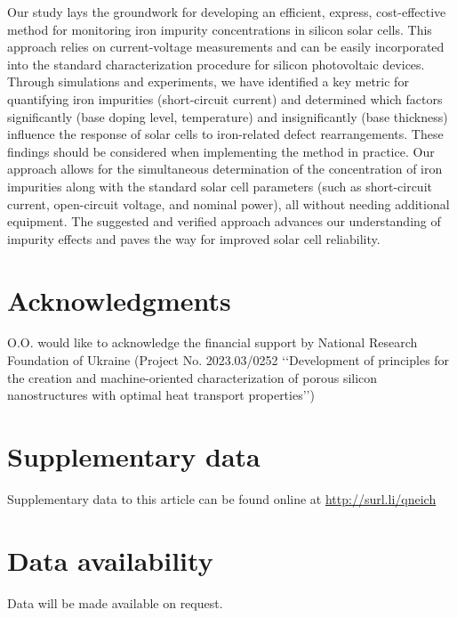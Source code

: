 \documentclass[a4paper,fleqn]{cas-sc}
\begin{document}
Our study lays the groundwork for developing an efficient, express, cost-effective method for monitoring iron impurity concentrations in silicon solar cells.
This approach relies on current-voltage measurements and can be easily incorporated into the standard characterization procedure for silicon photovoltaic devices.
Through simulations and experiments, we have identified a key metric for quantifying iron impurities (short-circuit current) and determined which factors significantly (base doping level, temperature) and insignificantly (base thickness) influence the response of solar cells to iron-related defect rearrangements.
These findings should be considered when implementing the method in practice.
Our approach allows for the simultaneous determination of the concentration of iron impurities along with the standard solar cell parameters (such as short-circuit current, open-circuit voltage, and nominal power), all without needing additional equipment.
The suggested and verified approach advances our understanding of impurity effects and paves the way for improved solar cell reliability.


\section*{Acknowledgments}
O.O. would like to acknowledge the financial support by
National Research Foundation of Ukraine (Project No. 2023.03/0252
‘‘Development of principles for the creation and machine-oriented
characterization of porous silicon nanostructures with optimal
heat transport properties’’)

\section*{Supplementary data}\label{SuplData}
Supplementary data to this article can be found online at
\url{http://surl.li/qneich}

\section*{Data availability}
Data will be made available on request.







\end{document}
